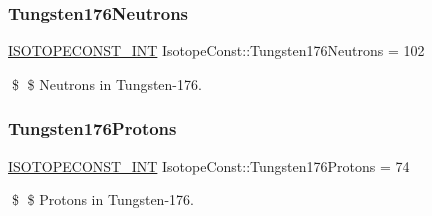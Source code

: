\subsubsection{\texorpdfstring{Tungsten176\+Neutrons}{Tungsten176Neutrons}}
{\footnotesize\ttfamily \mbox{\hyperlink{group___isotope_const-_macros_ga5f18360b3e99483a35c32d789e62621c}{I\+S\+O\+T\+O\+P\+E\+C\+O\+N\+S\+T\+\_\+\+I\+NT}} Isotope\+Const\+::\+Tungsten176\+Neutrons = 102}

\$ \$ Neutrons in Tungsten-\/176. \mbox{\label{group___isotope_const-_tungsten-_w176_gace7b14f25cfaf399446380e4de6a9d52}} 
\subsubsection{\texorpdfstring{Tungsten176\+Protons}{Tungsten176Protons}}
{\footnotesize\ttfamily \mbox{\hyperlink{group___isotope_const-_macros_ga5f18360b3e99483a35c32d789e62621c}{I\+S\+O\+T\+O\+P\+E\+C\+O\+N\+S\+T\+\_\+\+I\+NT}} Isotope\+Const\+::\+Tungsten176\+Protons = 74}

\$ \$ Protons in Tungsten-\/176. 